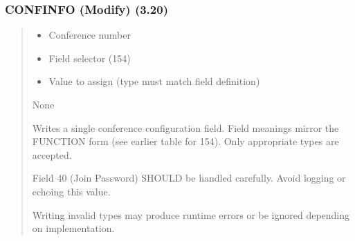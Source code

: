 \documentclass[letterpaper,10pt,english]{sphinxmanual}
\begin{document}
\subsubsection{CONFINFO (Modify) (3.20)}
\label{\detokenize{ppl:confinfo-modify-3-20}}\begin{quote}

\sphinxAtStartPar
{}
\begin{description}
\begin{itemize}
\item {} 
\sphinxAtStartPar
{}  \textendash{} Conference number

\item {} 
\sphinxAtStartPar
{}    \textendash{} Field selector (1\textendash{}54)

\item {} 
\sphinxAtStartPar
{} \textendash{} Value to assign (type must match field definition)

\end{itemize}

\sphinxAtStartPar
None

\sphinxAtStartPar
Writes a single conference configuration field. Field meanings mirror the FUNCTION
form (see earlier table for 1\textendash{}54). Only appropriate types are accepted.
\begin{description}
\sphinxAtStartPar
Field 40 (Join Password) SHOULD be handled carefully. Avoid logging or echoing this value.

\end{description}

\end{description}

\sphinxAtStartPar
{}
\begin{quote}

\begin{sphinxVerbatim}[commandchars=\\\{\}]
 
\end{sphinxVerbatim}
\end{quote}
\begin{description}
\sphinxAtStartPar
Writing invalid types may produce runtime errors or be ignored depending on implementation.


\end{description}
\end{quote}
\end{document}
